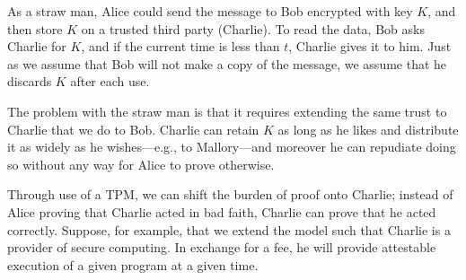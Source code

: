 \documentclass{article}
\begin{document}
As a straw man, Alice could send the message to Bob encrypted with key $K$, and then store $K$ on a trusted third party (Charlie). To read the data, Bob asks Charlie for $K$, and if the current time is less than $t$, Charlie gives it to him. Just as we assume that Bob will not make a copy of the message, we assume that he discards $K$ after each use.

The problem with the straw man is that it requires extending the same trust to Charlie that we do to Bob. Charlie can retain $K$ as long as he likes and distribute it as widely as he wishes---e.g., to Mallory---and moreover he can repudiate doing so without any way for Alice to prove otherwise.

Through use of a TPM, we can shift the burden of proof onto Charlie; instead of Alice proving that Charlie acted in bad faith, Charlie can prove that he acted correctly. Suppose, for example, that we extend the model such that Charlie is a provider of secure computing. In exchange for a fee, he will provide attestable execution of a given program at a given time. 
\end{document}

